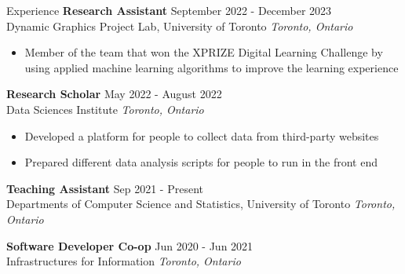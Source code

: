 \documentclass{resume} %
\begin{document}
\begin{rSection}{Experience}
    \textbf{Research Assistant} \hfill September 2022 - December 2023\\Dynamic Graphics Project Lab, University of Toronto \hfill \textit{Toronto, Ontario}
    \begin{itemize}
        \itemsep -3pt {} 
        \item Member of the team that won the XPRIZE Digital Learning Challenge by using applied machine learning algorithms to improve the learning experience
    \end{itemize}

    \textbf{Research Scholar} \hfill May 2022 - August 2022\\Data Sciences Institute \hfill \textit{Toronto, Ontario}
    \begin{itemize}
        \itemsep -3pt {} 
        \item Developed a platform for people to collect data from third-party websites
        \item Prepared different data analysis scripts for people to run in the front end
    \end{itemize}

    \textbf{Teaching Assistant} \hfill Sep 2021 - Present\\Departments of Computer Science and Statistics, University of Toronto \hfill \textit{Toronto, Ontario}
    
    \textbf{Software Developer Co-op} \hfill Jun 2020 - Jun 2021\\Infrastructures for Information \hfill \textit{Toronto, Ontario}

\end{rSection} 
\end{document}
